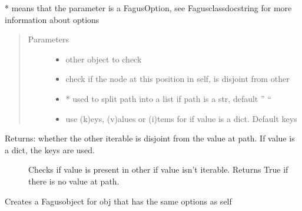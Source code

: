 \documentclass[a4paper,10pt,english]{sphinxmanual}
\begin{document}
\begin{fulllineitems}
\begin{fulllineitems}
\sphinxAtStartPar
* means that the parameter is a FagusOption, see Fagus\sphinxhyphen{}class\sphinxhyphen{}docstring for more information about options
\begin{quote}\begin{description}
\item[{Parameters}] \leavevmode\begin{itemize}
\item {}
\sphinxAtStartPar
{} \textendash{} other object to check

\item {}
\sphinxAtStartPar
{} \textendash{} check if the node at this position in self, is disjoint from other

\item {}
\sphinxAtStartPar
{} \textendash{} * used to split path into a list if path is a str, default ” “

\item {}
\sphinxAtStartPar
{} \textendash{} use (k)eys, (v)alues or (i)tems for if value is a dict. Default keys

\end{itemize}

\end{description}\end{quote}
\begin{description}
\item[{Returns: whether the other iterable is disjoint from the value at path. If value is a dict, the keys are used.}] \leavevmode
\sphinxAtStartPar
Checks if value is present in other if value isn’t iterable. Returns True if there is no value at path.

\end{description}

\end{fulllineitems}


\begin{fulllineitems}
\label{\detokenize{fagus:fagus.Fagus.child}}
\pysigstartsignatures
{}
\pysigstopsignatures
\sphinxAtStartPar
Creates a Fagus\sphinxhyphen{}object for obj that has the same options as self


\end{fulllineitems}
\end{fulllineitems}
\end{document}
